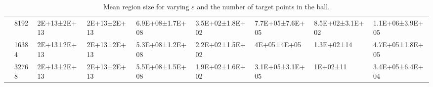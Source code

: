 \begin{table}
{\begin{tabular}{lllllllll}
 & 8192 & 2E+13±2E+13 & 2E+13±2E+13 & 6.9E+08±1.7E+08 & 3.5E+02±1.8E+02 & 7.7E+05±7.6E+05 & 8.5E+02±3.1E+02 & 1.1E+06±3.9E+05 \\
 & 16384 & 2E+13±2E+13 & 2E+13±2E+13 & 5.3E+08±1.2E+08 & 2.2E+02±1.5E+02 & 4E+05±4E+05 & 1.3E+02±14 & 4.7E+05±1.8E+05 \\
 & 32768 & 2E+13±2E+13 & 2E+13±2E+13 & 5.5E+08±1.5E+08 & 1.9E+02±1.6E+02 & 3.1E+05±3.1E+05 & 1E+02±11 & 3.4E+05±6.4E+04 \\
\cline{1-9}
\bottomrule
\end{tabular}
}
\caption{Mean region size for varying $\varepsilon$ and the number of target points in the ball.}
\end{table}
